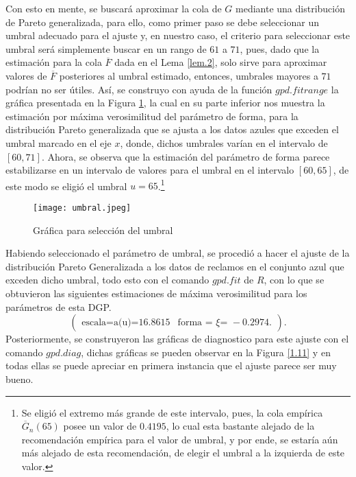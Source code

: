 \documentclass[10.5pt,notitlepage]{article}
\newcommand{\Matrix}[1]{\begin{pmatrix} #1 \end{pmatrix}}
\theoremstyle{plain}
\begin{document}
Con esto en mente, se buscará aproximar la cola de \(G\) mediante una distribución de Pareto generalizada, para ello, como primer paso se debe seleccionar un umbral adecuado para el ajuste y, en nuestro caso, el criterio para seleccionar este umbral será simplemente buscar en un rango de $61$ a $71$, pues, dado que la estimación para la cola \(\overline{F}\) dada en el Lema \ref{lem.2}, solo sirve para aproximar valores de \(\overline{F}\) posteriores al umbral estimado, entonces, umbrales mayores a \(71\) podrían no ser útiles. Así, se construyo con ayuda de la función \(gpd.fitrange\) la gráfica presentada en la Figura \ref{1.10}, la cual en su parte inferior nos muestra la estimación por máxima verosimilitud del parámetro de forma, para la distribución Pareto generalizada que se ajusta a los datos azules que exceden el umbral marcado en el eje \(x\), donde, dichos umbrales varían en el intervalo de \([60,71]\). Ahora, se observa que la estimación del parámetro de forma parece estabilizarse en un intervalo de valores para el umbral en el intervalo \([60,65]\), de este modo se eligió el umbral $u=65$.\footnote{Se eligió el extremo más grande de este intervalo, pues, la cola empírica \(\overline{G}_{n}(65)\) posee un valor de \(0.4195\), lo cual esta bastante alejado de la recomendación empírica para el valor de umbral, y por ende, se estaría aún más alejado de esta recomendación, de elegir el umbral a la izquierda de este valor.}
\begin{figure}[h]
\centering
\texttt{[image: umbral.jpeg]}
\caption{Gráfica para selección del umbral}
\label{1.10}
\end{figure}
Habiendo seleccionado el parámetro de umbral, se procedió a hacer el ajuste de la distribución Pareto Generalizada a los datos de reclamos en el conjunto azul que exceden dicho umbral, todo esto con el comando \(gpd.fit\) de \(R\), con lo que se obtuvieron las siguientes estimaciones de máxima verosimilitud para los parámetros de esta DGP.
\begin{equation}\label{params}
    \Matrix{\text{escala=a(u)=} 16.8615 & \text{forma = \(\xi\)= }-0.2974.
}.
\end{equation}
Posteriormente, se construyeron las gráficas de diagnostico para este ajuste con el comando \(gpd.diag\), dichas gráficas se pueden observar en la Figura \ref{1.11}  y en todas ellas se puede apreciar en primera instancia que el ajuste parece ser muy bueno.
\end{document}
